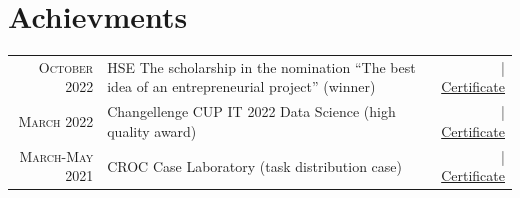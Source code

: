 \documentclass[a4paper,10pt]{article} %
\begin{document}
\section{Achievments}
\begin{tabular}{rp{8cm}r}
    \textsc{October} 2022 & HSE \>\> The scholarship in the nomination ``The best idea of an entrepreneurial project'' \footnotesize(winner)\normalsize&\href{https://cs.hse.ru/cppr/scholarship_2022_idea/}{\hfill | \footnotesize Certificate}\\
    \textsc{March} 2022 & Changellenge\>\> CUP IT 2022 Data Science \footnotesize(high quality award)\normalsize&\href{https://drive.google.com/file/d/1nzJZvqc1fVry3vje4rqn_khu6yu5ZKk9/view?usp=sharing}{\hfill | \footnotesize Certificate}\\

    \textsc{March-May} 2021 & CROC\>\> Case Laboratory \footnotesize(task distribution case)\normalsize&\href{https://drive.google.com/file/d/1pMN4490Kn86PVl2UGvcGSIRORIqeMZGi/view?usp=sharing}{\hfill | \footnotesize Certificate}
    \end{tabular}
\end{document}
